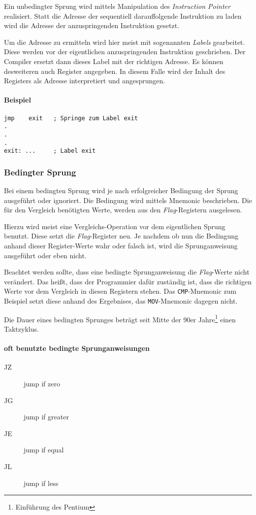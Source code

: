 Ein unbedingter Sprung wird mittels Manipulation des \textit{Instruction Pointer} realisiert.
Statt die Adresse der sequentiell darauffolgende Instruktion zu laden wird die Adresse der anzuspringenden Instruktion gesetzt.

Um die Adresse zu ermitteln wird hier meist mit sogenannten \textit{Labels} gearbeitet. Diese werden vor der eigentlichen anzuspringenden Instruktion geschrieben. Der Compiler ersetzt dann dieses Label mit der richtigen Adresse. Es können desweiteren auch Register angegeben. In diesem Falle wird der Inhalt des Registers als Adresse interpretiert und angesprungen.

\paragraph{Beispiel\newline}\makebox{}
\begin{lstlisting}
jmp    exit   ; Springe zum Label exit
.
.
.
exit: ...     ; Label exit
\end{lstlisting}

\subsubsection{Bedingter Sprung}
Bei einem bedingten Sprung wird je nach erfolgreicher Bedingung der Sprung ausgeführt oder ignoriert. Die Bedingung wird mittels Mnemonic beschrieben. Die für den Vergleich benötigten Werte, werden aus den \textit{Flag}-Registern ausgelesen.

Hierzu wird meist eine Vergleichs-Operation vor dem eigentlichen Sprung benutzt. Diese setzt die \textit{Flag}-Register neu. Je nachdem ob nun die Bedingung anhand dieser Register-Werte wahr oder falsch ist, wird die Sprunganweisung ausgeführt oder eben nicht. 

Beachtet werden sollte, dass eine bedingte Sprunganweisung die \textit{Flag}-Werte nicht verändert. Das heißt, dass der Programmier dafür zuständig ist, dass die richtigen Werte vor dem Vergleich in diesen Registern stehen. Das \texttt{CMP}-Mnemonic zum Beispiel setzt diese anhand des Ergebnises, das \texttt{MOV}-Mnemonic dagegen nicht.

Die Dauer eines bedingten Sprunges beträgt seit Mitte der 90er Jahre\footnote{Einführung des Pentium} einen Taktzyklus.

\paragraph{oft benutzte bedingte Sprunganweisungen}
\begin{description}
	\item [JZ] jump if zero
	\item [JG] jump if greater 
	\item [JE] jump if equal 
	\item [JL] jump if less 
\end{description}

